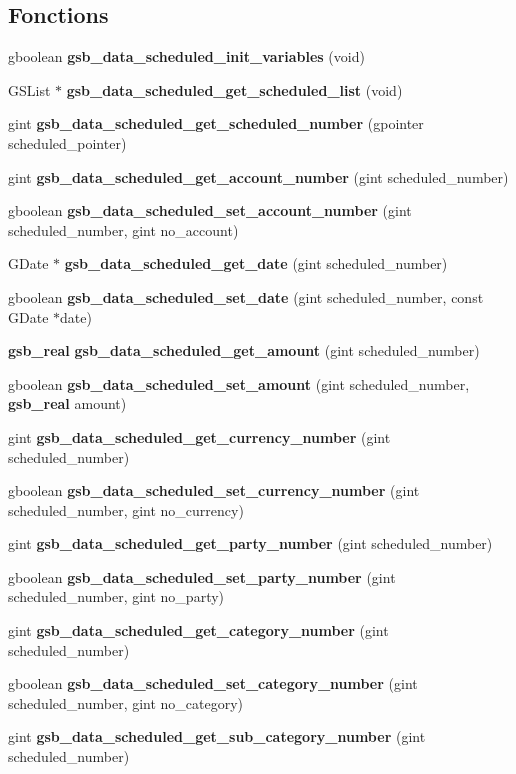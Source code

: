 \subsection*{Fonctions}
\begin{DoxyCompactItemize}
\item 
gboolean {\bf gsb\_\-data\_\-scheduled\_\-init\_\-variables} (void)
\item 
GSList $\ast$ {\bf gsb\_\-data\_\-scheduled\_\-get\_\-scheduled\_\-list} (void)
\item 
gint {\bf gsb\_\-data\_\-scheduled\_\-get\_\-scheduled\_\-number} (gpointer scheduled\_\-pointer)
\item 
gint {\bf gsb\_\-data\_\-scheduled\_\-get\_\-account\_\-number} (gint scheduled\_\-number)
\item 
gboolean {\bf gsb\_\-data\_\-scheduled\_\-set\_\-account\_\-number} (gint scheduled\_\-number, gint no\_\-account)
\item 
GDate $\ast$ {\bf gsb\_\-data\_\-scheduled\_\-get\_\-date} (gint scheduled\_\-number)
\item 
gboolean {\bf gsb\_\-data\_\-scheduled\_\-set\_\-date} (gint scheduled\_\-number, const GDate $\ast$date)
\item 
{\bf gsb\_\-real} {\bf gsb\_\-data\_\-scheduled\_\-get\_\-amount} (gint scheduled\_\-number)
\item 
gboolean {\bf gsb\_\-data\_\-scheduled\_\-set\_\-amount} (gint scheduled\_\-number, {\bf gsb\_\-real} amount)
\item 
gint {\bf gsb\_\-data\_\-scheduled\_\-get\_\-currency\_\-number} (gint scheduled\_\-number)
\item 
gboolean {\bf gsb\_\-data\_\-scheduled\_\-set\_\-currency\_\-number} (gint scheduled\_\-number, gint no\_\-currency)
\item 
gint {\bf gsb\_\-data\_\-scheduled\_\-get\_\-party\_\-number} (gint scheduled\_\-number)
\item 
gboolean {\bf gsb\_\-data\_\-scheduled\_\-set\_\-party\_\-number} (gint scheduled\_\-number, gint no\_\-party)
\item 
gint {\bf gsb\_\-data\_\-scheduled\_\-get\_\-category\_\-number} (gint scheduled\_\-number)
\item 
gboolean {\bf gsb\_\-data\_\-scheduled\_\-set\_\-category\_\-number} (gint scheduled\_\-number, gint no\_\-category)
\item 
gint {\bf gsb\_\-data\_\-scheduled\_\-get\_\-sub\_\-category\_\-number} (gint scheduled\_\-number)
\item 

\end{DoxyCompactItemize}
